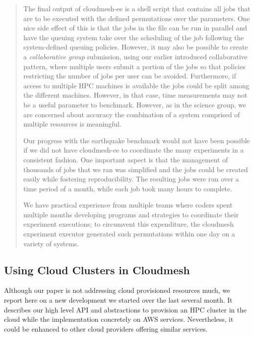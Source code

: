 \documentclass[utf8]{FrontiersinVancouver} %
\begin{document}
\begin{quote}
The final output of cloudmesh-ee is a shell script that contains all jobs that are to be executed with the defined permutations over the parameters. One nice side effect of this is that the jobs in the file can be run in parallel and have the queuing system take over the scheduling of the job following the system-defined queuing policies. However, it may also be possible to create a {\it collaborative group} submission, using our earlier introduced collaborative pattern, where multiple users submit a portion of the jobs so that policies restricting the number of jobs per user can be avoided. Furthermore, if access to multiple HPC machines is available the jobs could be split among the different machines. However, in that case, time measurements may not be a useful parameter to benchmark. However, as in the science group, we are concerned about accuracy the combination of a system comprised of multiple resources is meaningful.

Our progress with the earthquake benchmark would not have been possible if we did not have cloudmesh-ee to coordinate the many experiments in a consistent fashion. One important aspect is that the management of thousands of jobs that we ran was simplified and the jobs could be created easily while fostering reproducibility. The resulting jobs were run over a time period of a month, while each job took many hours to complete.

We have practical experience from multiple teams where coders spent multiple months developing programs and strategies to coordinate their experiment executions; to circumvent this expenditure, the cloudmesh experiment executor generated such permutations within one day on a variety of systems.

\end{quote}


\subsection{Using Cloud Clusters in Cloudmesh}

Although our paper is not addressing cloud provisioned resources much, we report here on a new development we started over the last several month. It describes our high level API and abstractions to provision an HPC cluster in the cloud while the implementation concretely on AWS services. Nevertheless, it could be enhanced to other cloud providers offering similar services.
\end{document}
